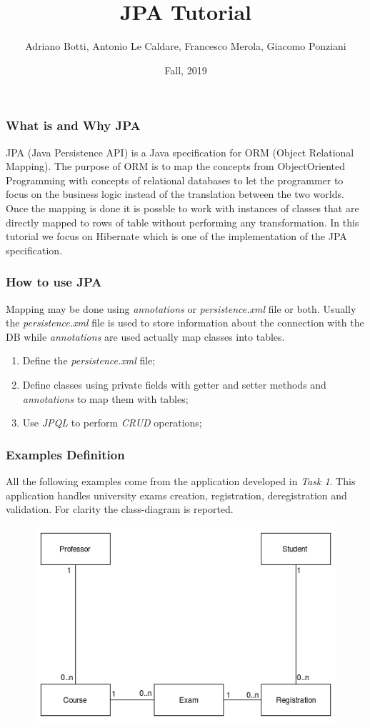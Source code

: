 \documentclass{beamer}
\title{JPA Tutorial}
\author{Adriano Botti, Antonio Le Caldare, Francesco Merola, Giacomo Ponziani}
\institute{Information Systems, University of Pisa}
\date{Fall, 2019}
\begin{document}
\frame{\titlepage}

\begin{frame}
\frametitle{What is and Why JPA}
JPA (Java Persistence API) is a Java specification for ORM (Object Relational Mapping). The purpose of ORM is to map the concepts from ObjectOriented Programming with concepts of relational databases to let the programmer to focus on the business logic instead of the translation between the two worlds. Once the mapping is done it is possble to work with instances of classes that are directly mapped to rows of table without performing any transformation.
In this tutorial we focus on Hibernate which is one of the implementation of the JPA specification. 
\end{frame}

\begin{frame}
\frametitle{How to use JPA}
Mapping may be done using \textit{annotations} or \textit{persistence.xml} file or both. Usually the \textit{persistence.xml} file is used to store information about the connection with the DB while \textit{annotations} are used actually map classes into tables.
\begin{enumerate}
\item Define the \textit{persistence.xml} file;
\item Define classes using private fields with getter and setter methods and \textit{annotations} to map them with tables;
\item Use \textit{JPQL} to perform \textit{CRUD} operations;
\end{enumerate}
\end{frame}

\begin{frame}
\frametitle{Examples Definition}
All the following examples come from the application developed in \textit{Task 1}. This application handles university exams creation, registration, deregistration and validation.
For clarity the class-diagram is reported.
\linebreak
\begin{figure}
\includegraphics[scale=0.45]{ClassDiagram.png}
\centering
\end{figure}
\end{frame}
\end{document}
